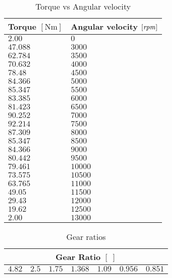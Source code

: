 %
\begin{table}[h!]
    \centering
    \begin{tabular}{@{}ll@{}}
    \toprule
    \multicolumn{1}{l}{\textbf{Torque} $[\si{\newton\metre}]$} & \multicolumn{1}{l}{\textbf{Angular velocity $[\it rpm]$}} \\ \midrule
    $2.00  $  &  $0    $ \\
    $47.088$  &  $3000 $ \\
    $62.784$  &  $3500 $ \\
    $70.632$  &  $4000 $ \\
    $78.48 $  &  $4500 $ \\
    $84.366$  &  $5000 $ \\
    $85.347$  &  $5500 $ \\
    $83.385$  &  $6000 $ \\
    $81.423$  &  $6500 $ \\
    $90.252$  &  $7000 $ \\
    $92.214$  &  $7500 $ \\
    $87.309$  &  $8000 $ \\
    $85.347$  &  $8500 $ \\
    $84.366$  &  $9000 $ \\
    $80.442$  &  $9500 $ \\
    $79.461$  &  $10000$ \\
    $73.575$  &  $10500$ \\
    $63.765$  &  $11000$ \\
    $49.05 $  &  $11500$ \\
    $29.43 $  &  $12000$ \\
    $19.62 $  &  $12500$ \\
    $2.00  $  &  $13000$ \\ 
    \bottomrule
    \end{tabular}
    \caption{Torque vs Angular velocity}
    \label{tab:wheelcoordinates}
\end{table}
%

%
\begin{table}[h!]
    \centering
    \begin{tabular}{@{}ccccccc@{}}
    \toprule
    \multicolumn{7}{c}{\textbf{Gear Ratio} $[\;]$} \\ \midrule
        $4.82$ & $2.5$ & $1.75$ & $1.368$ & $1.09$ & $0.956$ & $0.851$\\
    \bottomrule
    \end{tabular}
    \caption{Gear ratios}
    \label{tab:wheelcoordinates}
\end{table}
%



